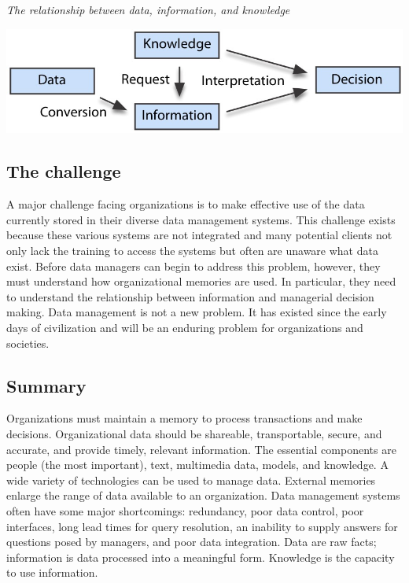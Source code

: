 \documentclass[
]{article}
\begin{document}
\emph{The relationship between data, information, and knowledge}

\includegraphics{Figures/Chapter 1/data-info-know.jpg}

\hypertarget{the-challenge}{%
\subsection*{The challenge}\label{the-challenge}}

A major challenge facing organizations is to make effective use of the
data currently stored in their diverse data management systems. This
challenge exists because these various systems are not integrated and
many potential clients not only lack the training to access the systems
but often are unaware what data exist. Before data managers can begin to
address this problem, however, they must understand how organizational
memories are used. In particular, they need to understand the
relationship between information and managerial decision making. Data
management is not a new problem. It has existed since the early days of
civilization and will be an enduring problem for organizations and
societies.

\hypertarget{summary}{%
\subsection*{Summary}\label{summary}}

Organizations must maintain a memory to process transactions and make
decisions. Organizational data should be shareable, transportable,
secure, and accurate, and provide timely, relevant information. The
essential components are people (the most important), text, multimedia
data, models, and knowledge. A wide variety of technologies can be used
to manage data. External memories enlarge the range of data available to
an organization. Data management systems often have some major
shortcomings: redundancy, poor data control, poor interfaces, long lead
times for query resolution, an inability to supply answers for questions
posed by managers, and poor data integration. Data are raw facts;
information is data processed into a meaningful form. Knowledge is the
capacity to use information.
\end{document}
